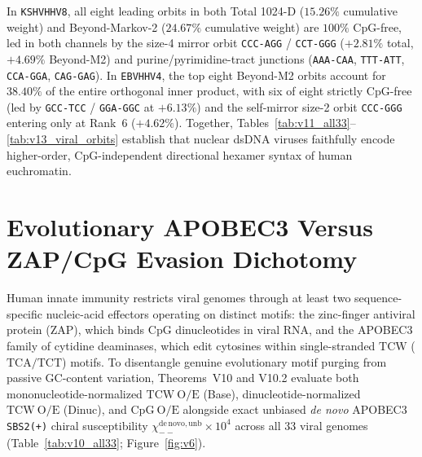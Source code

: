 \documentclass[11pt, a4paper]{article}
\DeclareRobustCommand{\_}{\textunderscore\allowbreak}
\begin{document}
In \texttt{KSHV\_HHV8}, all eight leading orbits in both Total 1024-D ($15.26\%$ cumulative weight) and Beyond-Markov-2 ($24.67\%$ cumulative weight) are $100\%$ CpG-free, led in both channels by the size-4 mirror orbit \texttt{CCC-AGG} / \texttt{CCT-GGG} ($+2.81\%$ total, $+4.69\%$ Beyond-M2) and purine/pyrimidine-tract junctions (\texttt{AAA-CAA}, \texttt{TTT-ATT}, \texttt{CCA-GGA}, \texttt{CAG-GAG}). In \texttt{EBV\_HHV4}, the top eight Beyond-M2 orbits account for $38.40\%$ of the entire orthogonal inner product, with six of eight strictly CpG-free (led by \texttt{GCC-TCC} / \texttt{GGA-GGC} at $+6.13\%$) and the self-mirror size-2 orbit \texttt{CCC-GGG} entering only at Rank~6 ($+4.62\%$). Together, Tables~\ref{tab:v11_all33}--\ref{tab:v13_viral_orbits} establish that nuclear dsDNA viruses faithfully encode higher-order, CpG-independent directional hexamer syntax of human euchromatin.

\section{Evolutionary APOBEC3 Versus ZAP/CpG Evasion Dichotomy}
\label{sec:evasion}

Human innate immunity restricts viral genomes through at least two sequence-specific nucleic-acid effectors operating on distinct motifs: the zinc-finger antiviral protein (ZAP), which binds $\mathrm{CpG}$ dinucleotides in viral RNA, and the APOBEC3 family of cytidine deaminases, which edit cytosines within single-stranded $\mathrm{TCW}$ ($\mathrm{TCA}/\mathrm{TCT}$) motifs. To disentangle genuine evolutionary motif purging from passive GC-content variation, Theorems~V10 and V10.2 evaluate both mononucleotide-normalized $\mathrm{TCW\ O/E}$ (Base), dinucleotide-normalized $\mathrm{TCW\ O/E}$ (Dinuc), and $\mathrm{CpG\ O/E}$ alongside exact unbiased \textit{de novo} APOBEC3 \texttt{SBS2(+)} chiral susceptibility $\chi_{--}^{\mathrm{de\,novo,unb}} \times 10^4$ across all 33 viral genomes (Table~\ref{tab:v10_all33}; Figure~\ref{fig:v6}).
\end{document}
